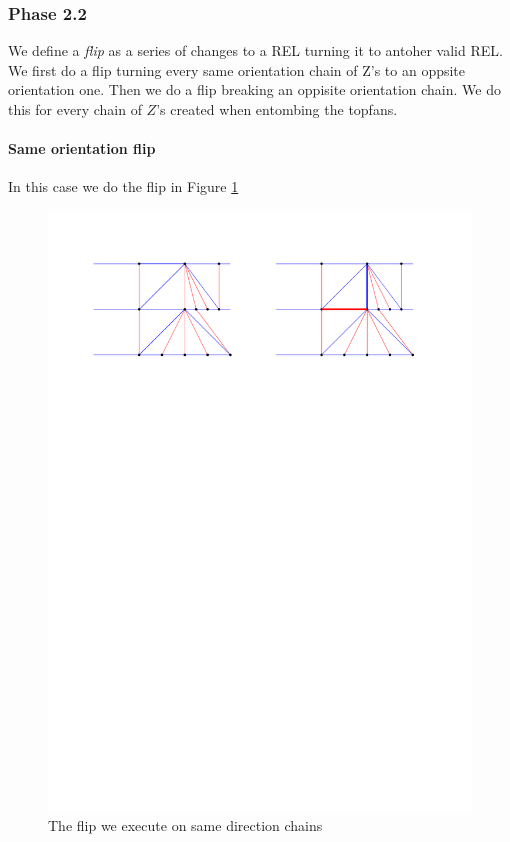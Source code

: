 \subsubsection{Phase 2.2}


We define a \emph{flip} as a series of changes to a REL turning it to antoher valid REL.
We first do a flip turning every same orientation chain of Z's to an oppsite orientation one. Then we do a flip breaking an oppisite orientation chain. We do this for every chain of $Z$'s created when entombing the topfans.  


\paragraph{Same orientation flip}

In this case we do the flip in Figure \ref{fig:uni:sameFlip}

\begin{figure}[h]
  \centering
  \includegraphics[width =\textwidth]{unifiedAlgo/img/post/sameFlip}
  \caption{The flip we execute on same direction chains}
  \label{fig:uni:sameFlip}
\end{figure}

